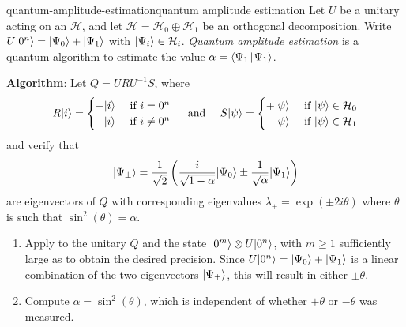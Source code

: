 \begin{topic}{quantum-amplitude-estimation}{quantum amplitude estimation}
    Let $U$ be a unitary acting on an  $\mathcal{H}$, and let $\mathcal{H} = \mathcal{H}_0 \oplus \mathcal{H}_1$ be an orthogonal decomposition. Write $U |0^n\rangle = |\Psi_0\rangle + |\Psi_1\rangle$ with $|\Psi_i\rangle \in \mathcal{H}_i$. \emph{Quantum amplitude estimation} is a quantum algorithm to estimate the value $\alpha = \langle\Psi_1\!\mid\!\Psi_1\rangle$.

    \textbf{Algorithm}: Let $Q = U R U^{-1} S$, where
    \[ R |i\rangle = \begin{cases} + |i\rangle & \textup{ if } i = 0^n \\ - |i\rangle & \textup{ if } i \ne 0^n \end{cases} \quad \textup{ and } \quad S |\psi\rangle = \begin{cases} + |\psi\rangle & \textup{ if } |\psi\rangle \in \mathcal{H}_0 \\ - |\psi\rangle & \textup{ if } |\psi\rangle \in \mathcal{H}_1 \end{cases} \]
    and verify that
    \[ |\Psi_\pm\rangle = \frac{1}{\sqrt{2}} \left(\frac{i}{\sqrt{1 - \alpha}} |\Psi_0\rangle \pm \frac{1}{\sqrt{\alpha}} |\Psi_1\rangle\right) \]
    are eigenvectors of $Q$ with corresponding eigenvalues $\lambda_\pm = \exp(\pm 2 i \theta)$ where $\theta$ is such that $\sin^2(\theta) = \alpha$.
    \begin{enumerate}[label=(\arabic*)]
        \item Apply  to the unitary $Q$ and the state $|0^m\rangle \otimes U |0^n\rangle$, with $m \ge 1$ sufficiently large as to obtain the desired precision. Since $U |0^n\rangle = |\Psi_0\rangle + |\Psi_1\rangle$ is a linear combination of the two eigenvectors $|\Psi_\pm\rangle$, this will result in either $\pm \theta$.
        \item Compute $\alpha = \sin^2(\theta)$, which is independent of whether $+\theta$ or $-\theta$ was measured.
    \end{enumerate}
\end{topic}

